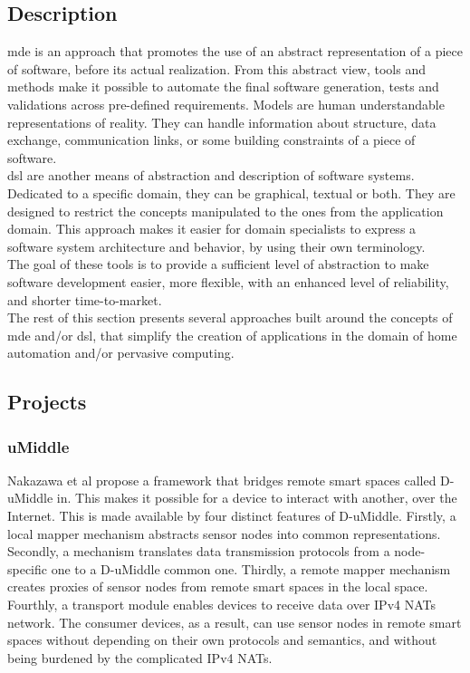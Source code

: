 \subsection{Description}
\label{sec:mdeEtDSL}


\gls{mde} is an approach that promotes the use of an abstract representation of a piece of software, before its actual realization. From this abstract view, tools and methods make it possible to automate the final software generation, tests and validations across pre-defined requirements. Models are human understandable representations of reality. They can handle information about structure, data exchange, communication links, or some building constraints of a piece of software.\\
\gls{dsl} are another means of abstraction and description of software systems. Dedicated to a specific domain, they can be graphical, textual or both. They are designed to restrict the concepts manipulated to the ones from the application domain. This approach makes it easier for domain specialists to express a software system architecture and behavior, by using their own terminology.\\

The goal of these tools is to provide a sufficient level of abstraction to make software development easier, more flexible, with an enhanced level of reliability, and shorter time-to-market.\\
The rest of this section presents several approaches built around the concepts of \gls{mde} and/or \gls{dsl}, that simplify the creation of applications in the domain of home automation and/or pervasive computing.\\


\subsection{Projects}

\subsubsection{uMiddle}
Nakazawa et al propose a framework that bridges remote smart spaces called D-uMiddle in\cite{Nakazawa:2007}. This makes it possible for a device to interact with another, over the Internet. This is made available by four distinct features of D-uMiddle. Firstly, a local mapper mechanism abstracts sensor nodes into common representations. Secondly, a mechanism translates data transmission protocols from a node-specific one to a D-uMiddle common one. Thirdly, a remote mapper mechanism creates proxies of sensor nodes from remote smart spaces in the local space. Fourthly, a transport module enables devices to receive data over IPv4 NATs network. The consumer devices, as a result, can use sensor nodes in remote smart spaces without depending on their own protocols and semantics, and without being burdened by the complicated IPv4 NATs.\\


